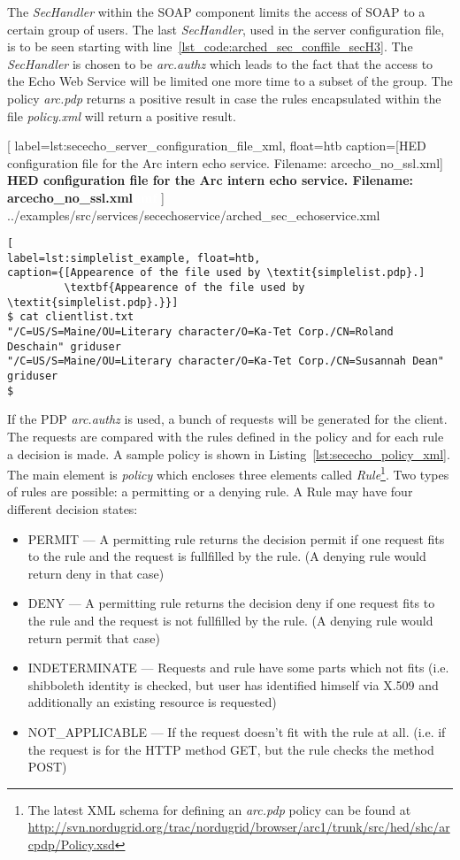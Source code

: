 The \textit{SecHandler} within the SOAP component limits the access of SOAP to a certain group of users.
%
%
The last \textit{SecHandler}, used in the server configuration file, is to be seen starting with line~\ref{lst_code:arched_sec_conffile_secH3}. The \textit{SecHandler} is chosen to be \textit{arc.authz} which leads to the fact that the access to the Echo Web Service will be limited one more time to a subset of the group. The policy \textit{arc.pdp} returns a positive result in case the rules encapsulated within the file \textit{policy.xml} will return a positive result.\\

	[
	label=lst:sececho_server_configuration_file_xml, float=htb
	caption={[HED configuration file for the Arc intern echo service. Filename: arcecho\_no\_ssl.xml]
	\textbf{HED configuration file for the Arc intern echo service. Filename: arcecho\_no\_ssl.xml\textcolor{white}{hmf}}}
	]
{../examples/src/services/secechoservice/arched_sec_echoservice.xml}



\begin{lstlisting}[
label=lst:simplelist_example, float=htb,
caption={[Appearence of the file used by \textit{simplelist.pdp}.]
         \textbf{Appearence of the file used by \textit{simplelist.pdp}.}}]
$ cat clientlist.txt
"/C=US/S=Maine/OU=Literary character/O=Ka-Tet Corp./CN=Roland Deschain" griduser
"/C=US/S=Maine/OU=Literary character/O=Ka-Tet Corp./CN=Susannah Dean" griduser
$
\end{lstlisting}

If the PDP \textit{arc.authz} is used, a bunch of requests will be generated for the client. The requests are compared with the rules defined in the policy and for each rule a decision is made.
A sample policy is shown in Listing~\ref{lst:sececho_policy_xml}. The main element is \textit{policy} which encloses three elements called \textit{Rule}\footnote{The latest XML schema for defining an \textit{arc.pdp} policy can be found at \url{http://svn.nordugrid.org/trac/nordugrid/browser/arc1/trunk/src/hed/shc/arcpdp/Policy.xsd}}. 
Two types of rules are possible: a permitting or a denying rule.
A Rule may have four different decision states:
\begin{itemize}
 \item PERMIT --- A permitting rule returns the decision permit if one request fits to the rule and 
the request is fullfilled by the rule. (A denying rule would return deny in that case)
 \item DENY --- A permitting rule returns the decision deny if one request fits to the rule  and the request is not fullfilled by the rule. (A denying rule would return permit that case)
 \item INDETERMINATE --- Requests and rule have some parts which not fits
(i.e. shibboleth identity is checked, but user has identified himself via X.509 and additionally an existing resource is requested)
 \item NOT\_APPLICABLE --- If the request doesn't fit with the rule at all. (i.e. if the 
request is for the HTTP method GET, but the rule checks the method POST)
\end{itemize}
\forcelinebreak

